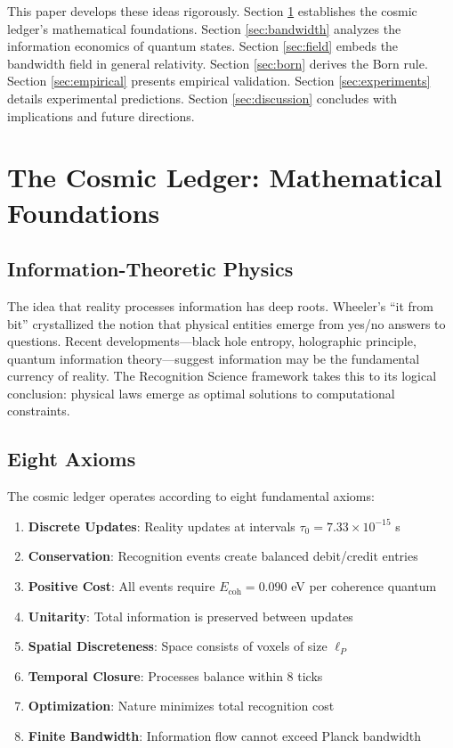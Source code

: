 \documentclass[twocolumn,prd,amsmath,amssymb,aps,superscriptaddress,nofootinbib]{revtex4-2}
\begin{document}
This paper develops these ideas rigorously. Section \ref{sec:ledger} establishes the cosmic ledger's mathematical foundations. Section \ref{sec:bandwidth} analyzes the information economics of quantum states. Section \ref{sec:field} embeds the bandwidth field in general relativity. Section \ref{sec:born} derives the Born rule. Section \ref{sec:empirical} presents empirical validation. Section \ref{sec:experiments} details experimental predictions. Section \ref{sec:discussion} concludes with implications and future directions.

\section{The Cosmic Ledger: Mathematical Foundations}
\label{sec:ledger}

\subsection{Information-Theoretic Physics}

The idea that reality processes information has deep roots. Wheeler's ``it from bit'' crystallized the notion that physical entities emerge from yes/no answers to questions. Recent developments—black hole entropy, holographic principle, quantum information theory—suggest information may be the fundamental currency of reality. The Recognition Science framework takes this to its logical conclusion: physical laws emerge as optimal solutions to computational constraints.

\subsection{Eight Axioms}

The cosmic ledger operates according to eight fundamental axioms:

\begin{enumerate}
\item \textbf{Discrete Updates}: Reality updates at intervals $\tau_0 = 7.33 \times 10^{-15}$ s
\item \textbf{Conservation}: Recognition events create balanced debit/credit entries
\item \textbf{Positive Cost}: All events require $E_{\text{coh}} = 0.090$ eV per coherence quantum
\item \textbf{Unitarity}: Total information is preserved between updates
\item \textbf{Spatial Discreteness}: Space consists of voxels of size $\ell_P$
\item \textbf{Temporal Closure}: Processes balance within 8 ticks
\item \textbf{Optimization}: Nature minimizes total recognition cost
\item \textbf{Finite Bandwidth}: Information flow cannot exceed Planck bandwidth
\end{enumerate}
\end{document}
